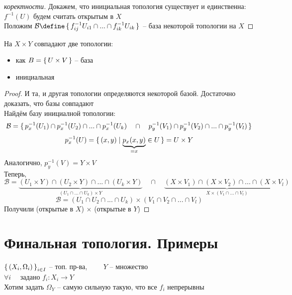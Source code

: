 \begin{proof}[коректности]
	Докажем, что инициальная топология существует и единственна: \\
	$ f^{-1}(U) $ будем считать открытым в $ X $ \\
	Положим $ \mathcal{B} \define \set{f_{ij}^{-1} U_{i1} \cap ... \cap f^{-1}_{ik} U_{ik}} $ -- база некоторой топологии на $ X $
\end{proof}

\begin{theorem}
	На $ X \times Y $ совпадают две топологии:
	\begin{itemize}
		\item как $ B = \set{U \times V} $ -- база
		\item инициальная
	\end{itemize}
\end{theorem}

\begin{proof}
	И та, и другая топологии определяются некоторой базой. Достаточно доказать, что базы совпадают \\
	Найдём базу инициалной топологии:
	$$ \mathcal{B} = \set{p_x^{-1}(U_1) \cap p_x^{-1}(U_2) \cap ... \cap p_x^{-1}(U_k) \quad \cap \quad p_y^{-1}(V_1) \cap p_y^{-1}(V_2) \cap ... \cap p_y^{-1}(V_l)} $$
	$$ p_x^{-1}(U) = \set{(x, y) | \underbrace{p_x(x, y)}_{= x} \in U} = U \times Y $$
	Аналогично, $ p_y^{-1}(V) = Y \times V $ \\
	Теперь,
	$$ \mathcal{B} = \underbrace{(U_1 \times Y) \cap (U_2 \times Y) \cap ... \cap (U_k \times Y)}_{(U_1 \cap ... \cap U_k) \times Y} \quad \cap \quad \underbrace{(X \times V_1) \cap (X \times V_2) \cap ... \cap (X \times V_l)}_{X \times (V_1 \cap ... \cap V_l)} $$
	$$ \mathcal{B} = (U_1 \cap U_2 \cap ... \cap U_k) \times (V_1 \cap V_2 \cap ... \cap V_l) $$
	Получили (открытые в $ X $) $ \times $ (открытые в $ Y $)
\end{proof}

\section{Финальная топология. Примеры}

\begin{definition}
	$ \set{(X_i, \Omega_i)}_{i \in I} $ -- топ. пр-ва, $ \qquad Y $ -- множество \\
	$ \forall i \quad $ задано $ f_i : X_i \to Y $ \\
	Хотим задать $ \Omega_Y $ -- самую сильную такую, что все $ f_i $ непрерывны
\end{definition}

